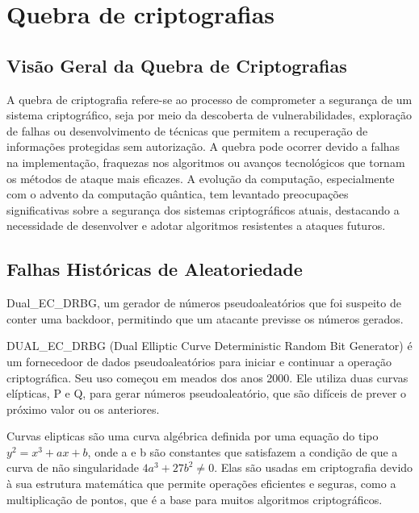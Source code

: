 \chapter{Quebra de criptografias}
    \section{Visão Geral da Quebra de Criptografias}

        A quebra de criptografia refere-se ao processo de comprometer a segurança de um sistema criptográfico, 
        seja por meio da descoberta de vulnerabilidades, exploração de falhas ou desenvolvimento de técnicas que permitem a recuperação de informações protegidas sem autorização. 
        A quebra pode ocorrer devido a falhas na implementação, fraquezas nos algoritmos ou avanços tecnológicos que tornam os métodos de ataque mais eficazes. 
        A evolução da computação, especialmente com o advento da computação quântica, tem levantado preocupações significativas sobre a segurança dos sistemas criptográficos atuais, 
        destacando a necessidade de desenvolver e adotar algoritmos resistentes a ataques futuros.
        
    \section{Falhas Históricas de Aleatoriedade}

        Dual\_EC\_DRBG, um gerador de números pseudoaleatórios que foi suspeito de conter uma backdoor, permitindo que um atacante previsse os números gerados. %
        
        DUAL\_EC\_DRBG (Dual Elliptic Curve Deterministic Random Bit Generator) é um fornecedoor de dados pseudoaleatórios para iniciar e continuar a operação criptográfica. Seu uso começou em meados dos anos 2000.
        Ele utiliza duas curvas elípticas, P e Q, para gerar números pseudoaleatório, que são difíceis de prever o próximo valor ou os anteriores.

        Curvas elipticas são uma curva algébrica definida por uma equação do tipo $y^2 = x^3 + ax + b$, onde a e b são constantes que satisfazem a condição de que a curva de não singularidade $4a^3 + 27b^2 \neq 0$.%
        Elas são usadas em criptografia devido à sua estrutura matemática que permite operações eficientes e seguras, como a multiplicação de pontos, que é a base para muitos algoritmos criptográficos. 
        
